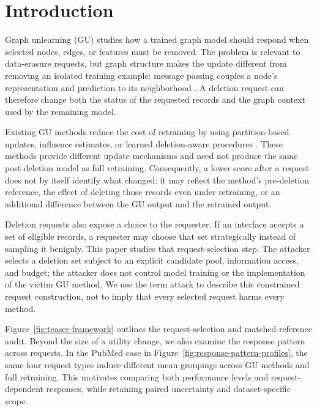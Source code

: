 \section{Introduction}
\label{sec:intro}

Graph unlearning (GU) studies how a trained graph model should respond when selected nodes, edges, or features must be removed. The problem is relevant to data-erasure requests, but graph structure makes the update different from removing an isolated training example: message passing couples a node's representation and prediction to its neighborhood \cite{gdpr2016,ccpa2018,kipf2017semi}. A deletion request can therefore change both the status of the requested records and the graph context used by the remaining model.

Existing GU methods reduce the cost of retraining by using partition-based updates, influence estimates, or learned deletion-aware procedures \cite{chen2022graph,wu2023gif,cheng2023gnndelete,li2024towards,dong2024idea}. These methods provide different update mechanisms and need not produce the same post-deletion model as full retraining. Consequently, a lower score after a request does not by itself identify what changed: it may reflect the method's pre-deletion reference, the effect of deleting those records even under retraining, or an additional difference between the GU output and the retrained output.

Deletion requests also expose a choice to the requester. If an interface accepts a set of eligible records, a requester may choose that set strategically instead of sampling it benignly. This paper studies that request-selection step. The attacker selects a deletion set subject to an explicit candidate pool, information access, and budget; the attacker does not control model training or the implementation of the victim GU method. We use the term attack to describe this constrained request construction, not to imply that every selected request harms every method.

Figure~\ref{fig:teaser-framework} outlines the request-selection and matched-reference audit. Beyond the size of a utility change, we also examine the response pattern across requests. In the PubMed case in Figure~\ref{fig:response-pattern-profiles}, the same four request types induce different mean groupings across GU methods and full retraining. This motivates comparing both performance levels and request-dependent responses, while retaining paired uncertainty and dataset-specific scope.


